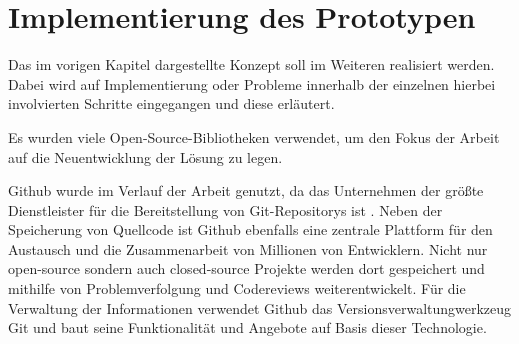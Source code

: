 \chapter{Implementierung des Prototypen}

Das im vorigen Kapitel dargestellte Konzept soll im Weiteren realisiert werden. Dabei wird auf Implementierung oder Probleme innerhalb der einzelnen hierbei involvierten Schritte eingegangen und diese erläutert.

Es wurden viele Open-Source-Bibliotheken verwendet, um den Fokus der Arbeit auf die Neuentwicklung der Lösung zu legen.

Github wurde im Verlauf der Arbeit genutzt, da das Unternehmen der größte Dienstleister für die Bereitstellung von Git-Repositorys ist \cite{Chacon2014}. Neben der Speicherung von Quellcode ist Github ebenfalls eine zentrale Plattform für den Austausch und die Zusammenarbeit von Millionen von Entwicklern. Nicht nur open-source sondern auch closed-source Projekte werden dort gespeichert und mithilfe von Problemverfolgung und Codereviews weiterentwickelt. Für die Verwaltung der Informationen verwendet Github das Versionsverwaltungwerkzeug Git und baut seine Funktionalität und Angebote auf Basis dieser Technologie.

